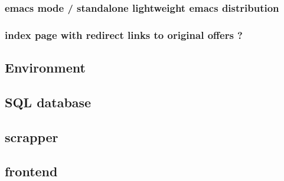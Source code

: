 \documentclass[11pt]{article}
\begin{document}
\subsubsection{emacs mode / standalone lightweight emacs distribution}
\label{sec:org60a2752}
\subsubsection{index page with redirect  links to original offers ?}
\label{sec:org91f3b05}
\subsection{Environment}
\label{sec:orgd6d042d}
\subsection{SQL database}
\label{sec:org52f9dd0}
\subsection{scrapper}
\label{sec:org49db4ff}
\subsection{frontend}
\label{sec:org375b2eb}
\end{document}
